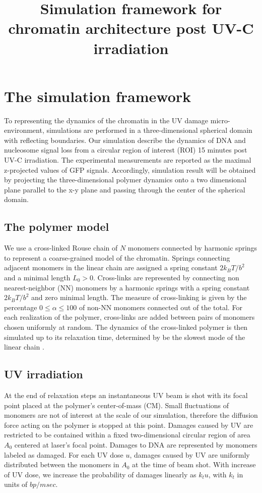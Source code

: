 \documentclass[12pt]{article}
\begin{document}
	
	\title{Simulation framework for chromatin architecture post UV-C irradiation}
\maketitle
\section{The simulation framework}
	To representing the dynamics of the chromatin in the UV damage micro-environment, simulations are performed in a three-dimensional spherical domain with reflecting boundaries. Our simulation describe the dynamics of DNA and nucleosome signal loss from a circular region of interest (ROI) 15 minutes post UV-C irradiation. The experimental measurements are reported as the maximal z-projected values of GFP signals. Accordingly, simulation result will be obtained by projecting the three-dimensional polymer dynamics onto a two dimensional plane parallel to the x-y plane and passing through the center of the spherical domain. 
	
	\subsection{The polymer model}
	We use a cross-linked Rouse chain of $N$ monomers connected by harmonic springs \cite{doi1988theory} to represent a coarse-grained model of the chromatin. Springs connecting adjacent monomers in the linear chain are assigned a spring constant $2k_BT/b^2$ and a minimal length $L_0>0$. Cross-links are represented by connecting non nearest-neighbor (NN) monomers by a harmonic springs with a spring constant $2k_BT/b^2$ and zero minimal length. The measure of cross-linking is given by the percentage $0\leq \alpha\leq 100$ of non-NN monomers connected out of the total. For each realization of the polymer, cross-links are added between pairs of monomers chosen uniformly at random. The dynamics of the cross-linked polymer is then simulated up to its relaxation time, determined by be the slowest mode of the linear chain \cite{doi1988theory}.
	
	\subsection{UV irradiation}
	At the end of relaxation steps an instantaneous UV beam is shot with its focal point placed at the polymer's center-of-mass (CM). Small fluctuations of monomers are not of interest at the scale of our simulation, therefore the diffusion force acting on the polymer is stopped at this point. Damages caused by UV are restricted to be contained within a fixed two-dimensional circular region of area $A_0$ centered at laser's focal point. Damages to DNA are represented by monomers labeled as damaged. For each UV dose $u$, damages caused by UV are uniformly distributed between the monomers in $A_0$ at the time of beam shot. With increase of UV dose, we increase the probability of damages linearly as $k_tu$, with $k_t$ in units of $bp/msec$. 
	
\end{document}
